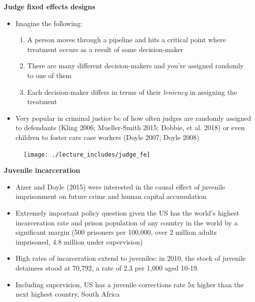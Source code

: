 \documentclass[notes=show]{beamer}
\begin{document}
\begin{frame}
\begin{center}
\textbf{Judge fixed effects designs}
\end{center}

	\begin{itemize}
	\item Imagine the following:
		\begin{enumerate}
		\item A person moves through a pipeline and hits a critical point where treatment occurs as a result of some decision-maker
		\item There are many different decision-makers and you're assigned randomly to one of them
		\item Each decision-maker differs in terms of their \emph{leniency} in assigning the treatment
		\end{enumerate}
	\item Very popular in criminal justice bc of how often judges are randomly assigned to defendants (Kling 2006; Mueller-Smith 2015; Dobbie, et al. 2018) or even children to foster care case workers (Doyle 2007; Doyle 2008)
	\end{itemize}
\end{frame}

\begin{frame}[plain]

	\begin{figure}
	\texttt{[image: ./lecture\_includes/judge\_fe]}
	\end{figure}

\end{frame}

\begin{frame}[plain]
\begin{center}
\textbf{Juvenile incarceration}
\end{center}

	\begin{itemize}
	\item Aizer and Doyle (2015) were interested in the causal effect of juvenile imprisonment on future crime and human capital accumulation
	\item Extremely important policy question given the US has the world's highest incarceration rate and prison population of any country in the world by a significant margin (500 prisoners per 100,000, over 2 million adults imprisoned, 4.8 million under supervision)
	\item High rates of incarceration extend to juveniles: in 2010, the stock of juvenile detainees stood at 70,792, a rate of 2.3 per 1,000 aged 10-19. 
	\item Including supervision, US has a juvenile corrections rate 5x higher than the next highest country, South Africa
	\end{itemize}
	
\end{frame}
\end{document}
